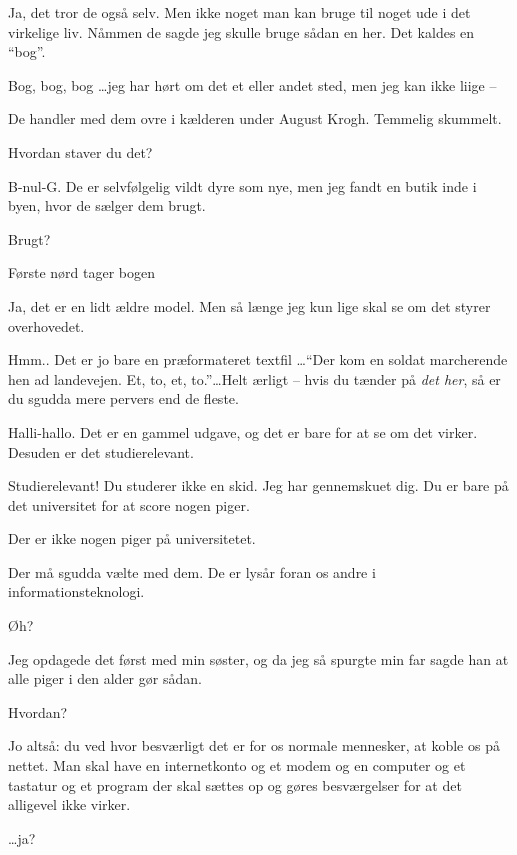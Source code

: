 \documentclass[danish]{article}
\begin{document}
\begin{sketch}
 Ja, det tror de også selv. Men ikke noget man kan bruge
til noget ude i det virkelige liv. Nåmmen de sagde jeg skulle bruge sådan
en her. Det kaldes en ``bog''.

 Bog, bog, bog \ldots jeg har hørt om det et eller andet
sted, men jeg kan ikke liige --

 De handler med dem ovre i kælderen under August Krogh.
Temmelig skummelt.

 Hvordan staver du det?

 B-nul-G. De er selvfølgelig vildt dyre som nye, men
jeg fandt en butik inde i byen, hvor de sælger dem brugt.

 Brugt?

\scene Første nørd tager bogen

 Ja, det er en lidt ældre model. Men så længe jeg kun lige
skal se om det styrer overhovedet.

 Hmm..  Det er jo bare en præformateret
textfil \ldots ``Der kom en soldat marcherende hen ad landevejen. Et, to, et,
to.''\ldots Helt ærligt -- hvis du tænder på \emph{det her}, så er du
sgudda mere pervers end de fleste.

 Halli-hallo. Det er en gammel udgave, og det er bare for
at se om det virker. Desuden er det studierelevant.

 Studierelevant! Du studerer ikke en skid. Jeg har
gennemskuet dig. Du er bare på det universitet for at score nogen piger.

 Der er ikke nogen piger på universitetet.

 Der må sgudda vælte med dem. De er lysår foran os andre
i informationsteknologi.

 Øh?

 Jeg opdagede det først med min søster, og da jeg så
spurgte min far sagde han at alle piger i den alder gør sådan.

 Hvordan?

 Jo altså: du ved hvor besværligt det er for os normale
mennesker, at koble os på nettet. Man skal have en internetkonto og et modem
og en computer og et tastatur og et program der skal sættes op og gøres
besværgelser for at det alligevel ikke virker.

 \ldots{}ja?


\end{sketch}
\end{document}
